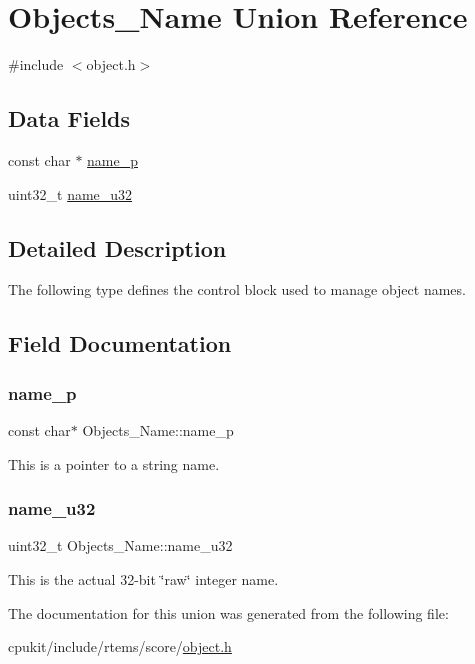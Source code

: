 \hypertarget{unionObjects__Name}{}\section{Objects\+\_\+\+Name Union Reference}
\label{unionObjects__Name}


{\ttfamily \#include $<$object.\+h$>$}

\subsection*{Data Fields}
\begin{DoxyCompactItemize}
\item 
const char $\ast$ \mbox{\hyperlink{unionObjects__Name_a1de03806036bf0cbbe24e09563f8bff4}{name\+\_\+p}}
\item 
uint32\+\_\+t \mbox{\hyperlink{unionObjects__Name_add5624b47b2bde08518484f35a980d0e}{name\+\_\+u32}}
\end{DoxyCompactItemize}


\subsection{Detailed Description}
The following type defines the control block used to manage object names. 

\subsection{Field Documentation}
\mbox{\label{unionObjects__Name_a1de03806036bf0cbbe24e09563f8bff4}} 
\subsubsection{\texorpdfstring{name\_p}{name\_p}}
{\footnotesize\ttfamily const char$\ast$ Objects\+\_\+\+Name\+::name\+\_\+p}

This is a pointer to a string name. \mbox{\label{unionObjects__Name_add5624b47b2bde08518484f35a980d0e}} 
\subsubsection{\texorpdfstring{name\_u32}{name\_u32}}
{\footnotesize\ttfamily uint32\+\_\+t Objects\+\_\+\+Name\+::name\+\_\+u32}

This is the actual 32-\/bit \char`\"{}raw\char`\"{} integer name. 

The documentation for this union was generated from the following file\+:\begin{DoxyCompactItemize}
\item 
cpukit/include/rtems/score/\mbox{\hyperlink{score_2object_8h}{object.\+h}}\end{DoxyCompactItemize}
